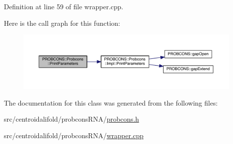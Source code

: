 Definition at line 59 of file wrapper.\+cpp.



Here is the call graph for this function\+:
\nopagebreak
\begin{figure}[H]
\begin{center}
\leavevmode
\includegraphics[width=350pt]{class_p_r_o_b_c_o_n_s_1_1_probcons_aba4729d2c1968bb7696ee5ead2bf770e_cgraph}
\end{center}
\end{figure}




The documentation for this class was generated from the following files\+:\begin{DoxyCompactItemize}
\item 
src/centroidalifold/probcons\+R\+N\+A/\hyperlink{probcons_8h}{probcons.\+h}\item 
src/centroidalifold/probcons\+R\+N\+A/\hyperlink{probcons_r_n_a_2wrapper_8cpp}{wrapper.\+cpp}\end{DoxyCompactItemize}

